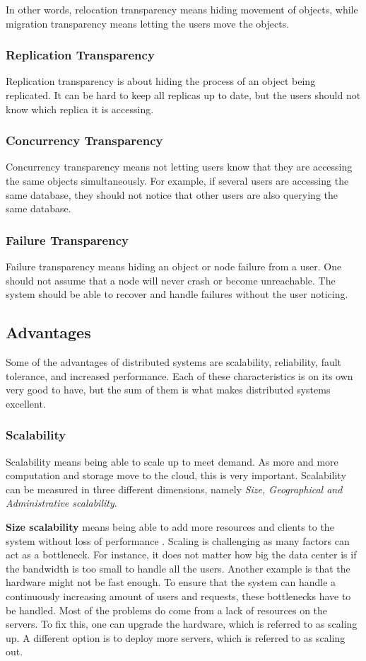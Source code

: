 In other words, relocation transparency means hiding movement of objects, while migration transparency means letting the users move the objects.

\subsubsection{Replication Transparency}
Replication transparency is about hiding the process of an object being replicated. It can be hard to keep all replicas up to date, but the users should not know which replica it is accessing.

\subsubsection{Concurrency Transparency}
Concurrency transparency means not letting users know that they are accessing the same objects simultaneously. For example, if several users are accessing the same database, they should not notice that other users are also querying the same database.

\subsubsection{Failure Transparency}
Failure transparency means hiding an object or node failure from a user. One should not assume that a node will never crash or become unreachable. The system should be able to recover and handle failures without the user noticing.


\subsection{Advantages}
Some of the advantages of distributed systems are scalability, reliability, fault tolerance, and increased performance. Each of these characteristics is on its own very good to have, but the sum of them is what makes distributed systems excellent.

\subsubsection{Scalability}
Scalability means being able to scale up to meet demand. As more and more computation and storage move to the cloud, this is very important. Scalability can be measured in three different dimensions, namely \textit{Size, Geographical and Administrative scalability}.

\textbf{Size scalability} means being able to add more resources and clients to the system without loss of performance \cite{steen_distributed_2017}. Scaling is challenging as many factors can act as a bottleneck. For instance, it does not matter how big the data center is if the bandwidth is too small to handle all the users. Another example is that the hardware might not be fast enough. To ensure that the system can handle a continuously increasing amount of users and requests, these bottlenecks have to be handled. Most of the problems do come from a lack of resources on the servers. To fix this, one can upgrade the hardware, which is referred to as scaling up. A different option is to deploy more servers, which is referred to as scaling out.

